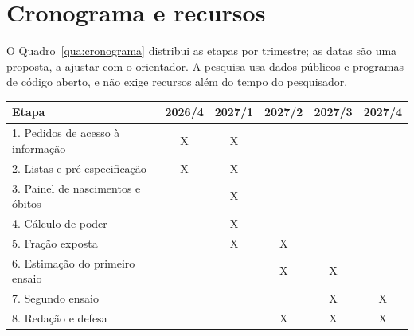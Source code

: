 \chapter{Cronograma e recursos}
\label{sec:cronograma}

O Quadro~\ref{qua:cronograma} distribui as etapas por trimestre; as datas são
uma proposta, a ajustar com o orientador. A pesquisa usa dados públicos e
programas de código aberto, e não exige recursos além do tempo do pesquisador.

\begin{quadro}[ht]
\centering\small
\caption{Cronograma proposto}
\label{qua:cronograma}
\begin{tabular}{|l|c|c|c|c|c|}
\hline
Etapa & 2026/4 & 2027/1 & 2027/2 & 2027/3 & 2027/4 \\
\hline
1. Pedidos de acesso à informação & X & X & & & \\ \hline
2. Listas e pré-especificação     & X & X & & & \\ \hline
3. Painel de nascimentos e óbitos &   & X & & & \\ \hline
4. Cálculo de poder               &   & X & & & \\ \hline
5. Fração exposta                 &   & X & X & & \\ \hline
6. Estimação do primeiro ensaio   &   &   & X & X & \\ \hline
7. Segundo ensaio                 &   &   &   & X & X \\ \hline
8. Redação e defesa               &   &   & X & X & X \\ \hline
\end{tabular}
\end{quadro}
